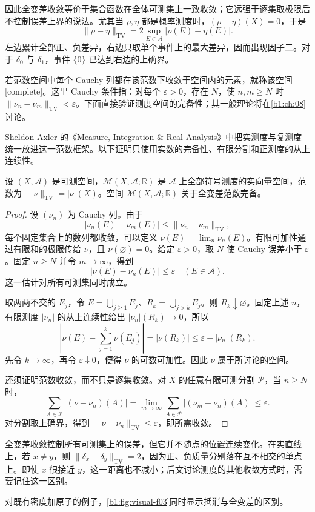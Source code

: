 因此全变差收敛等价于集合函数在全体可测集上一致收敛；它远强于逐集取极限后不控制误差上界的说法。尤其当 \(\rho,\eta\) 都是概率测度时，\((\rho-\eta)(X)=0\)，于是
\[
\|\rho-\eta\|_{\mathrm{TV}}
=2\sup_{E\in\mathcal A}|\rho(E)-\eta(E)|.
\]
左边累计全部正、负差异，右边只取单个事件上的最大差异，因而出现因子二。对于 \(\delta_0\) 与 \(\delta_1\)，事件 \(\{0\}\) 已达到右边的上确界。

\ProseParagraphBreak

若范数空间中每个 Cauchy 列都在该范数下收敛于空间内的元素，就称该空间[complete]。这里 Cauchy 条件指：对每个 \(\varepsilon>0\)，存在 \(N\)，使 \(n,m\geq N\) 时 \(\|\nu_n-\nu_m\|_{\mathrm{TV}}<\varepsilon\)。下面直接验证测度空间的完备性；其一般理论将在\cref{b1:ch:08}讨论。

\ProseParagraphBreak

Sheldon Axler 的《Measure, Integration \& Real Analysis》\cite[Section 9A]{Axler2020Measure}中把实测度与复测度统一放进这一范数框架。以下证明只使用实数的完备性、有限分割和正测度的从上连续性。

\begin{theorem}\label{b1:thm:signed-measures-complete}
设 \((X,\mathcal A)\) 是可测空间，\(\mathcal M(X,\mathcal A;\mathbb R)\) 是 \(\mathcal A\) 上全部符号测度的实向量空间，范数为 \(\|\nu\|_{\mathrm{TV}}=|\nu|(X)\)。空间 \(\mathcal M(X,\mathcal A;\mathbb R)\) 关于全变差范数完备。
\end{theorem}
\begin{proof}
设 \((\nu_n)\) 为 Cauchy 列。由于
\[
|\nu_n(E)-\nu_m(E)|\leq\|\nu_n-\nu_m\|_{\mathrm{TV}},
\]
每个固定集合上的数列都收敛，可以定义 \(\nu(E)=\lim_n\nu_n(E)\)。有限可加性通过有限和的极限传给 \(\nu\)，且 \(\nu(\varnothing)=0\)。给定 \(\varepsilon>0\)，取 \(N\) 使 Cauchy 误差小于 \(\varepsilon\)。固定 \(n\geq N\) 并令 \(m\to\infty\)，得到
\[
|\nu(E)-\nu_n(E)|\leq\varepsilon\quad(E\in\mathcal A).
\]
这一估计对所有可测集同时成立。

取两两不交的 \(E_j\)，令 \(E=\bigcup_{j\geq1}E_j\)、\(R_k=\bigcup_{j>k}E_j\)。则 \(R_k\downarrow\varnothing\)。固定上述 \(n\)，有限测度 \(|\nu_n|\) 的从上连续性给出 \(|\nu_n|(R_k)\to0\)，所以
\[
\left|\nu(E)-\sum_{j=1}^k\nu(E_j)\right|
=|\nu(R_k)|\leq\varepsilon+|\nu_n|(R_k).
\]
先令 \(k\to\infty\)，再令 \(\varepsilon\downarrow0\)，便得 \(\nu\) 的可数可加性。因此 \(\nu\) 属于所讨论的空间。

还须证明范数收敛，而不只是逐集收敛。对 \(X\) 的任意有限可测分割 \(\mathcal P\)，当 \(n\geq N\) 时，
\[
\sum_{A\in\mathcal P}|(\nu-\nu_n)(A)|
=\lim_{m\to\infty}\sum_{A\in\mathcal P}|(\nu_m-\nu_n)(A)|
\leq\varepsilon.
\]
对分割取上确界，得到 \(\|\nu-\nu_n\|_{\mathrm{TV}}\leq\varepsilon\)，即所需收敛。
\end{proof}

全变差收敛控制所有可测集上的误差，但它并不随点的位置连续变化。在实直线上，若 \(x\ne y\)，则 \(\|\delta_x-\delta_y\|_{\mathrm{TV}}=2\)，因为正、负质量分别落在互不相交的单点上。即使 \(x\) 很接近 \(y\)，这一距离也不减小；后文讨论测度的其他收敛方式时，需要记住这一区别。

对既有密度加原子的例子，\cref{b1:fig:visual-f03}同时显示抵消与全变差的区别。

